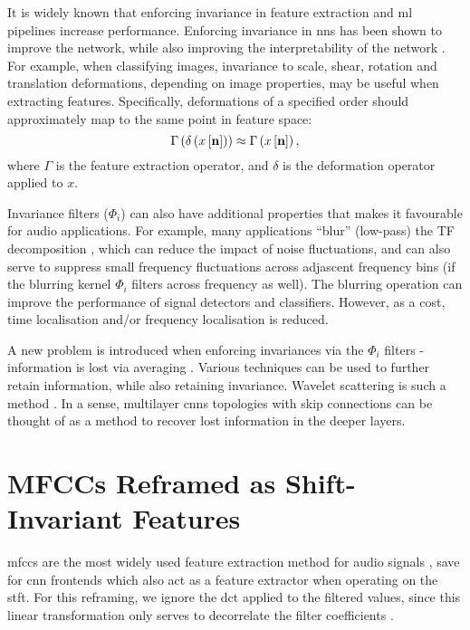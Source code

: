 It is widely known that enforcing invariance in feature extraction and \ac{ml} pipelines increase performance. Enforcing invariance in \acp{nn} has been shown to improve the network, while also improving the interpretability of the network \cite{cnninvariance2}. For example, when classifying images, invariance to scale, shear, rotation and translation deformations, de\-pending on image properties, may be useful when extracting features. Specifically, defor\-mations of a specified order should approximately map to the same point in feature space:
\begin{equation}
    \Gamma\left(\delta\left(x\left[\boldsymbol{\mathbf{n}}\right]\right)\right) \approx \Gamma\left(x\left[\boldsymbol{\mathbf{n}}\right]\right),
\end{equation}
where $\Gamma$ is the feature extraction operator, and $\delta$ is the deformation operator applied to $x$.

Invariance filters ($\Phi_i$) can also have additional properties that makes it favourable for audio applications. For example, many applications ``blur'' (low-pass) the TF decomposition \citep{seyicwt, speechmodulation}, which can reduce the impact of noise fluctuations, and can also serve to suppress small frequency fluctuations across adjascent frequency bins (if the blurring kernel $\Phi_i$ filters across frequency as well). The blurring operation can improve the performance of signal detectors and classifiers. However, as a cost, time localisation and/or frequency localisation is reduced.

A new problem is introduced when enforcing invariances via the $\Phi_i$ filters - information is lost via averaging \cite{1dscattering1}. Various techniques can be used to further retain information, while also retaining invariance. Wavelet scattering is such a method \cite{ws,2dscattering}. In a sense, multilayer \acp{cnn} topologies with skip connections can be thought of as a method to recover lost information in the deeper layers.

\section{MFCCs Reframed as Shift-Invariant Features}

\acp{mfcc} are the most widely used feature extraction method for audio signals \citep{mfccreview}, save for \ac{cnn} frontends which also act as a feature extractor when operating on the \ac{stft}. For this reframing, we ignore the \ac{dct} applied to the filtered values, since this linear transformation only serves to decorrelate the filter coefficients \citep{dctdecorrelation}.

